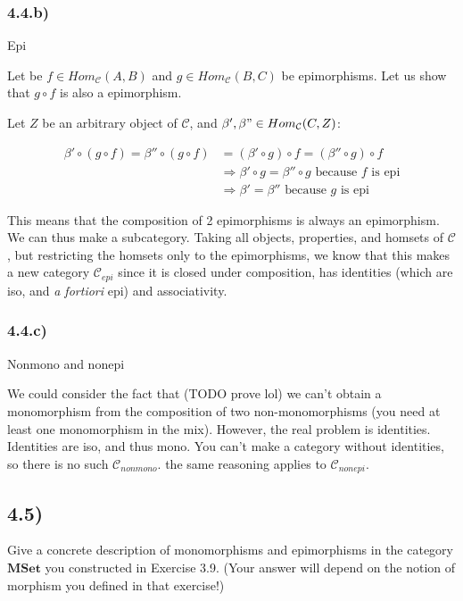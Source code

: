 \documentclass[12pt, letterpaper, twoside]{report}
\begin{document}
\subsubsection*{4.4.b)} Epi

Let be $f \in Hom_{\mathcal{C}} (A, B)$ and $g \in Hom_{\mathcal{C}} (B, C)$ be epimorphisms. Let us show that $g \circ f$ is also a epimorphism.

Let $Z$ be an arbitrary object of $\mathcal{C}$, and $\beta', \beta" \in Hom_{\mathcal{C}} (C, Z)$:

$$
\begin{aligned}
	\beta' \circ (g \circ f) = \beta'' \circ (g \circ f)
		& = (\beta' \circ g) \circ f = (\beta'' \circ g) \circ f \\
		& \Rightarrow \beta' \circ g =  \beta'' \circ g \text{ because $f$ is epi} \\
		& \Rightarrow \beta'         =  \beta''         \text{ because $g$ is epi}
\end{aligned}
$$

This means that the composition of 2 epimorphisms is always an epimorphism. We can thus make a subcategory. Taking all objects, properties, and homsets of $\mathcal{C}$, but restricting the homsets only to the epimorphisms, we know that this makes a new category $\mathcal{C}_{epi}$ since it is closed under composition, has identities (which are iso, and \textit{a fortiori} epi) and associativity.


\subsubsection*{4.4.c)} Nonmono and nonepi

We could consider the fact that (TODO prove lol) we can't obtain a monomorphism from the composition of two non-monomorphisms (you need at least one monomorphism in the mix). However, the real problem is identities. Identities are iso, and thus mono. You can't make a category without identities, so there is no such $\mathcal{C}_{nonmono}$. the same reasoning applies to $\mathcal{C}_{nonepi}$.



\subsection*{4.5)}

Give a concrete description of monomorphisms and epimorphisms in the category $\mathbf{MSet}$ you constructed in Exercise 3.9. (Your answer will depend on the notion of morphism you defined in that exercise!)
\end{document}
